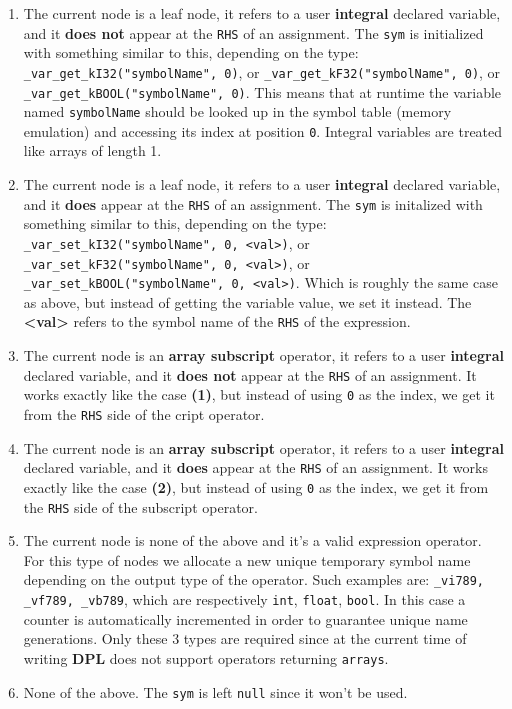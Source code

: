 \documentclass[a4paper]{article}
\begin{document}
\begin{enumerate}
  \item The current node is a leaf node, it refers to a user \textbf{integral} declared variable, and it \textbf{does not} appear at
    the \texttt{RHS} of an assignment. The \texttt{sym} is initialized with something similar to this, depending on the type:
    \texttt{\_var\_get\_kI32("symbolName", 0)}, or \texttt{\_var\_get\_kF32("symbolName", 0)}, or \texttt{\_var\_get\_kBOOL("symbolName", 0)}. This
    means that at runtime the variable named \texttt{symbolName} should be looked up in the symbol table (memory
    emulation) and accessing its index at position \texttt{0}. Integral variables are treated like arrays of length 1.
  \item The current node is a leaf node, it refers to a user \textbf{integral} declared variable, and it \textbf{does} appear
    at the \texttt{RHS} of an assignment. The \texttt{sym} is initalized with something similar to this, depending on the type:
    \texttt{\_var\_set\_kI32("symbolName", 0, <val>)}, or \texttt{\_var\_set\_kF32("symbolName", 0, <val>)}, or \texttt{\_var\_set\_kBOOL("symbolName", 0, <val>)}.
    Which is roughly the same case as above, but instead of getting the variable value, we set it instead.
    The \textbf{<val>} refers to the symbol name of the \texttt{RHS} of the expression.
  \item The current node is an \textbf{array subscript} operator, it refers to a user \textbf{integral} declared variable, and it \textbf{does not} appear at
    the \texttt{RHS} of an assignment. It works exactly like the case \textbf{(1)}, but instead of using \texttt{0} as the index, we get it from the \texttt{RHS}
    side of the cript operator.
  \item The current node is an \textbf{array subscript} operator, it refers to a user \textbf{integral} declared variable, and it \textbf{does } appear at
    the \texttt{RHS} of an assignment. It works exactly like the case \textbf{(2)}, but instead of using \texttt{0} as the index, we get it from
    the \texttt{RHS} side of the subscript operator.
  \item The current node is none of the above and it's a valid expression operator. For this type of nodes we allocate
    a new unique temporary symbol name depending on the output type of the operator. Such examples are:
    \texttt{\_vi789, \_vf789, \_vb789}, which are respectively \texttt{int}, \texttt{float}, \texttt{bool}. In
    this case a counter is automatically incremented in order to guarantee unique name generations. Only
    these 3 types are required since at the current time of writing \textbf{DPL} does not support operators
    returning \texttt{arrays}.
  \item None of the above. The \texttt{sym} is left \texttt{null} since it won't be used.
\end{enumerate}
\end{document}
